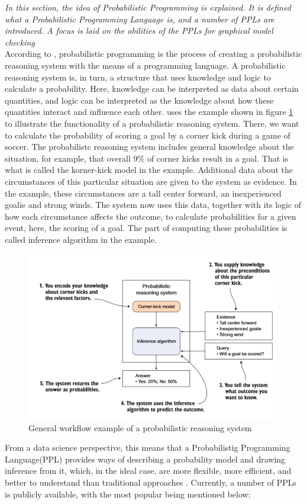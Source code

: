 \documentclass{article}
\begin{document}
\textit{In this section,  the idea of Probabilistic Programming is explained. It is defined what a Probabilistic Programming Language is, and a number of PPLs are introduced. A focus is laid on the abilities of the PPLs for graphical model checking}
\\
According to \cite{9781617292330}, probabilistic programming is the process of creating a probabilistic reasoning system with the means of a programming language. A probabilistic reasoning system is, in turn, a structure that uses knowledge and logic to calculate a probability. Here, knowledge can be interpreted as data about certain quantities, and logic can be interpreted as the knowledge about how these quantities interact and influence each other. \cite{9781617292330} uses the example shown in figure \ref{fig:example_prs} to illustrate the functionality of a probabilistic reasoning system. There, we want to calculate the probability of scoring a goal by a corner kick during a game of soccer. The probabilistc reasoning system includes general knowledge about the situation, for example, that overall 9\% of corner kicks result in a goal. That is what is called the korner-kick model in the example. Additional data about the circumstances of this particular situation are given to the system as evidence. In the example, these circumstances are a tall center forward, an inexperienced goalie and strong winds. The system now uses this data, together with its logic of how each circumstance affects the outcome, to calculate probabilities for a given event, here, the scoring of a goal. The part of computing these probabilities is called inference algorithm in the example.
\begin{figure}
	\includegraphics[width=\textwidth]{images/probabilistic_reasoning_system.PNG}
	\caption[General workflow example of a probabilistic reasoning system. Source: \cite{9781617292330}]{General workflow example of a probabilistic reasoning system}
	\label{fig:example_prs}
\end{figure}
From a data science perspective, this means that a Probabilistig Programming Language(PPL) provides ways of describing a probability model and drawing inference from it, which, in the ideal case, are more flexible, more efficient, and better to understand than traditional approaches \cite{Hardesty2015}. Currently, a number of PPLs is publicly available, with the most popular being mentioned below:
\end{document}
